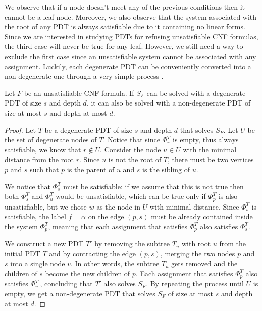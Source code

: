 We observe that if a node doesn't meet any of the previous conditions then it cannot be a leaf node. Moreover, we also observe that the system associated with the root of any PDT is always satisfiable due to it containing no linear forms. Since we are interested in studying PDTs for refusing unsatisfiable CNF formulas, the third case will never be true for any leaf. However, we still need a way to exclude the first case since an unsatisfiable system cannot be associated with any assignment. Luckily, each degenerate PDT can be conveniently converted into a non-degenerate one through a very simple process \cite{res_lin_2}.

\begin{proposition}
    \label{degenerate}
 Let $F$ be an unsatisfiable CNF formula. If $S_F$ can be solved with a degenerate PDT of size $s$ and depth $d$, it can also be solved with a non-degenerate PDT of size at most $s$ and depth at most $d$.
\end{proposition}

\begin{proof}
    
 Let $T$ be a degenerate PDT of size $s$ and depth $d$ that solves $S_F$. Let $U$ be the set of degenerate nodes of $T$. Notice that since $\Phi_r^T$ is empty, thus always satisfiable, we know that $r \notin U$. Consider the node $u \in U$ with the minimal distance from the root $r$. Since $u$ is not the root of $T$, there must be two vertices $p$ and $s$ such that $p$ is the parent of $u$ and $s$ is the sibling of $u$.

 We notice that $\Phi_s^T$ must be satisfiable: if we assume that this is not true then both $\Phi_s^T$ and $\Phi_u^T$ would be unsatisfiable, which can be true only if $\Phi_p^T$ is also unsatisfiable, but we chose $w$ as the node in $U$ with minimal distance. Since $\Phi_s^T$ is satisfiable, the label $f = \alpha$ on the edge $(p,s)$ must be already contained inside the system $\Phi_p^T$, meaning that each assignment that satisfies $\Phi_p^T$ also satisfies $\Phi_s^T$.

 We construct a new PDT $T'$ by removing the subtree $T_u$ with root $u$ from the initial PDT $T$ and by contracting the edge $(p,s)$, merging the two nodes $p$ and $s$ into a single node $v$. In other words, the subtree $T_u$ gets removed and the children of $s$ become the new children of $p$. Each assignment that satisfies $\Phi_p^T$ also satisfies $\Phi_v^{T'}$, concluding that $T'$ also solves $S_F$. By repeating the process until $U$ is empty, we get a non-degenerate PDT that solves $S_F$ of size at most $s$ and depth at most $d$.
\end{proof}

